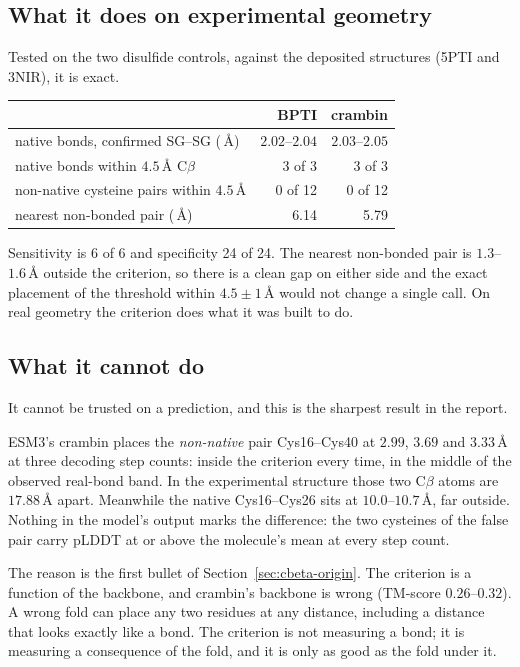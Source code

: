 \documentclass[11pt,a4paper]{article}
\newcommand{\ang}{\,\mbox{\AA}}
\newcommand{\plddt}{pLDDT}
\begin{document}
\subsection{What it does on experimental geometry}

Tested on the two disulfide controls, against the deposited structures (5PTI
and 3NIR), it is exact.

\begin{center}
\small
\begin{tabular}{@{}lrr@{}}
\toprule
 & BPTI & crambin \\
\midrule
native bonds, confirmed SG--SG ($\ang$) & $2.02$--$2.04$ & $2.03$--$2.05$ \\
native bonds within $4.5\ang$ C$\beta$ & 3 of 3 & 3 of 3 \\
non-native cysteine pairs within $4.5\ang$ & 0 of 12 & 0 of 12 \\
nearest non-bonded pair ($\ang$) & 6.14 & 5.79 \\
\bottomrule
\end{tabular}
\end{center}

\noindent Sensitivity is 6 of 6 and specificity 24 of 24. The nearest
non-bonded pair is $1.3$--$1.6\ang$ outside the criterion, so there is a clean
gap on either side and the exact placement of the threshold within
$4.5 \pm 1\ang$ would not change a single call. On real geometry the criterion
does what it was built to do.

\subsection{What it cannot do}
\label{sec:cbeta-cannot}

It cannot be trusted on a prediction, and this is the sharpest result in the
report.

ESM3's crambin places the \emph{non-native} pair Cys16--Cys40 at $2.99$,
$3.69$ and $3.33\ang$ at three decoding step counts: inside the criterion every
time, in the middle of the observed real-bond band. In the experimental
structure those two C$\beta$ atoms are $17.88\ang$ apart. Meanwhile the native
Cys16--Cys26 sits at $10.0$--$10.7\ang$, far outside. Nothing in the model's
output marks the difference: the two cysteines of the false pair carry \plddt{}
at or above the molecule's mean at every step count.

The reason is the first bullet of Section~\ref{sec:cbeta-origin}. The criterion is a
function of the backbone, and crambin's backbone is wrong (TM-score
$0.26$--$0.32$). A wrong fold can place any two residues at any distance,
including a distance that looks exactly like a bond. The criterion is not
measuring a bond; it is measuring a consequence of the fold, and it is only as
good as the fold under it.
\end{document}
